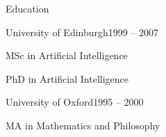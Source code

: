 \documentclass{resume} %
\begin{document}

\begin{rSection}{Education}
\begin{rSubsection}{University of Edinburgh}{1999 -- 2007}{}{}
\item MSc in Artificial Intelligence
\item PhD in Artificial Intelligence
\end{rSubsection}

\begin{rSubsection}{University of Oxford}{1995 -- 2000}{}{}
\item MA in Mathematics and Philosophy
\end{rSubsection}
\end{rSection}

\end{document}
